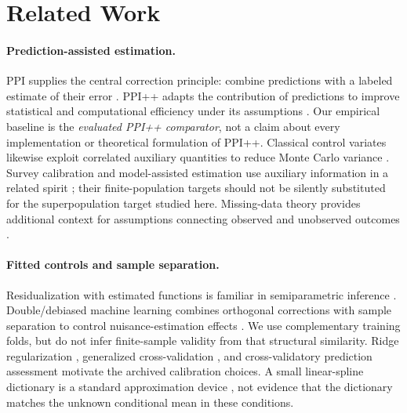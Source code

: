 \documentclass{article}
\begin{document}
\section{Related Work}
\paragraph{Prediction-assisted estimation.}
PPI supplies the central correction principle: combine predictions with a labeled estimate of their error \citep{Angelopoulos2023PPI}. PPI++ adapts the contribution of predictions to improve statistical and computational efficiency under its assumptions \citep{Angelopoulos2023PPIpp}. Our empirical baseline is the \emph{evaluated PPI++ comparator}, not a claim about every implementation or theoretical formulation of PPI++. Classical control variates likewise exploit correlated auxiliary quantities to reduce Monte Carlo variance \citep{Glasserman2004}. Survey calibration and model-assisted estimation use auxiliary information in a related spirit \citep{DevilleSarndal1992,Sarndal1992}; their finite-population targets should not be silently substituted for the superpopulation target studied here. Missing-data theory provides additional context for assumptions connecting observed and unobserved outcomes \citep{LittleRubin2019}.

\paragraph{Fitted controls and sample separation.}
Residualization with estimated functions is familiar in semiparametric inference \citep{Robinson1988,VanDerVaart1998}. Double/debiased machine learning combines orthogonal corrections with sample separation to control nuisance-estimation effects \citep{Chernozhukov2018DML}. We use complementary training folds, but do not infer finite-sample validity from that structural similarity. Ridge regularization \citep{HoerlKennard1970}, generalized cross-validation \citep{Golub1979GCV}, and cross-validatory prediction assessment \citep{Stone1974} motivate the archived calibration choices. A small linear-spline dictionary is a standard approximation device \citep{Hastie2009}, not evidence that the dictionary matches the unknown conditional mean in these conditions.
\end{document}
